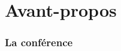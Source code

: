 \section*{Avant-propos}

\begin{frame}
    \frametitle{La conférence}
    \tableofcontents[pausesections]
\end{frame}
